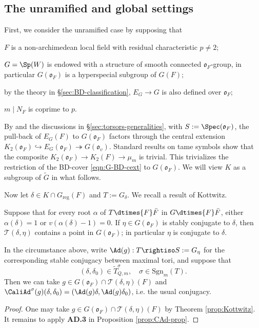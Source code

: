 \documentclass[a4paper,10pt]{article}
\begin{document}
\subsection{The unramified and global settings}\label{sec:nr-global}
First, we consider the unramified case by supposing that
\begin{compactitem}
	\item $F$ is a non-archimedean local field with residual characteristic $p \neq 2$;
	\item $G = \Sp(W)$ is endowed with a structure of smooth connected $\mathfrak{o}_F$-group, in particular $G(\mathfrak{o}_F)$ is a hyperspecial subgroup of $G(F)$;
	\item by the theory in \S\ref{sec:BD-classification}, $E_G \to G$ is also defined over $\mathfrak{o}_F$;
	\item $m \mid N_F$ is coprime to $p$.
\end{compactitem}

By \cite[10.7]{BD01} and the discussions in \S\ref{sec:torsors-generalities}, with $S := \Spec(\mathfrak{o}_F)$, the pull-back of $E_G(F)$ to $G(\mathfrak{o}_F)$ factors through the central extension $K_2(\mathfrak{o}_F) \hookrightarrow E_G(\mathfrak{o}_F) \twoheadrightarrow G(\mathfrak{o}_v)$. Standard results on tame symbols show that the composite $K_2(\mathfrak{o}_F) \to K_2(F) \to \mu_m$ is trivial. This trivializes the restriction of the BD-cover \eqref{eqn:G-BD-cext} to $G(\mathfrak{o}_F)$. We will view $K$ as a subgroup of $\tilde{G}$ in what follows.

Now let $\delta \in K \cap G_\text{reg}(F)$ and $T := G_\delta$. We recall a result of Kottwitz.
\begin{theorem}[{\cite[Proposition 7.1]{Ko86}}]\label{prop:Kottwitz}
	Suppose that for every root $\alpha$ of $T \dtimes{F} \bar{F}$ in $G \dtimes{F} \bar{F}$, either $\alpha(\delta) = 1$ or $v(\alpha(\delta)-1)=0$. If $\eta \in G(\mathfrak{o}_F)$ is stably conjugate to $\delta$, then $\mathcal{T}(\delta, \eta)$ contains a point in $G(\mathfrak{o}_F)$; in particular $\eta$ is conjugate to $\delta$.
\end{theorem}

\begin{proposition}\label{prop:CAd-unramified}
	In the circumstance above, write $\Ad(g): T \rightiso S := G_\eta$ for the corresponding stable conjugacy between maximal tori, and suppose that
	\[ (\delta, \delta_0) \in \tilde{T}^\sigma_{Q,m}, \quad \sigma \in \mathrm{Sgn}_m(T). \]
	Then we can take $g \in G(\mathfrak{o}_F) \cap \mathcal{T}(\delta, \eta)(F)$ and $\CaliAd^\sigma(g)(\delta, \delta_0) = (\Ad(g) \delta, \Ad(g)\delta_0)$, i.e. the usual conjugacy.
\end{proposition}
\begin{proof}
	One may take $g \in G(\mathfrak{o}_F) \cap \mathcal{T}(\delta, \eta)(F)$ by Theorem \ref{prop:Kottwitz}. It remains to apply \textbf{AD.3} in Proposition \ref{prop:CAd-prop}.
\end{proof}
\end{document}
